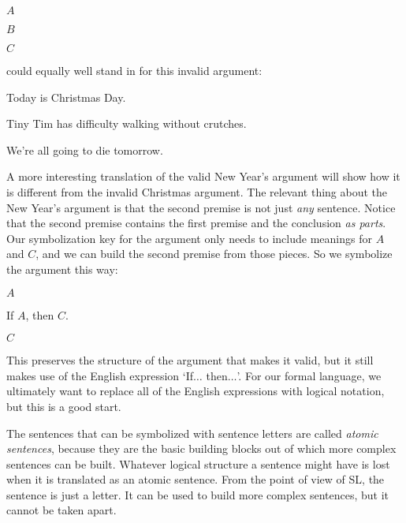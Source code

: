 \begin{earg}
\item[] $A$
\item[] $B$
\item[\therefore] $C$
\end{earg}

could equally well stand in for this invalid argument:

\begin{ekey}
\item[]Today is Christmas Day.
\item[]Tiny Tim has difficulty walking without crutches.
\item[\therefore]We're all going to die tomorrow.
\end{ekey}

A more interesting translation of the valid New Year's argument will show how it is different from the invalid Christmas argument. The relevant thing about the New Year's argument is that the second premise is not just \emph{any} sentence. Notice that the second premise contains the first premise and the conclusion \emph{as parts}. Our symbolization key for the argument only needs to include meanings for $A$ and $C$, and we can build the second premise from those pieces. So we symbolize the argument this way:
\begin{earg}
\item[] $A$
\item[] If $A$, then $C$.
\item[\therefore] $C$
\end{earg}
This preserves the structure of the argument that makes it valid, but it still makes use of the English expression `If$\ldots$ then$\ldots$'. For our formal language, we ultimately want to replace all of the English expressions with logical notation, but this is a good start.

The sentences that can be symbolized with sentence letters are called \emph{atomic sentences}, because they are the basic building blocks out of which more complex sentences can be built. Whatever logical structure a sentence might have is lost when it is translated as an atomic sentence. From the point of view of SL, the sentence is just a letter. It can be used to build more complex sentences, but it cannot be taken apart.


